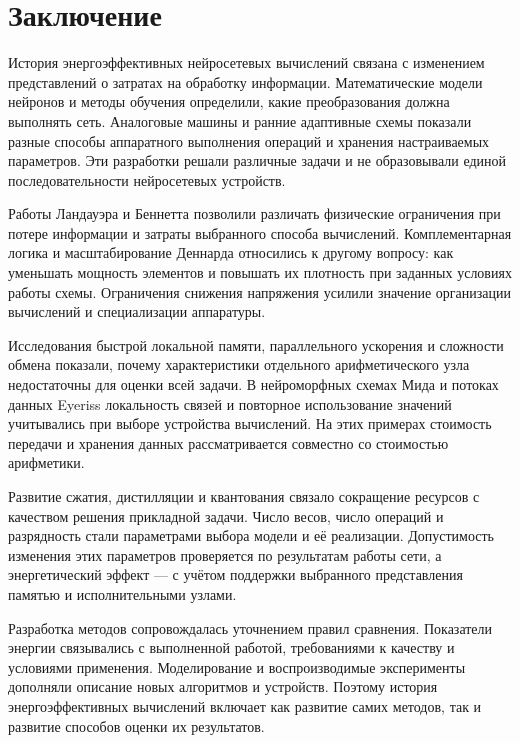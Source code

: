 \section*{Заключение}

История энергоэффективных нейросетевых вычислений связана
с изменением представлений о затратах на обработку информации.
Математические модели нейронов и методы обучения определили,
какие преобразования должна выполнять сеть. Аналоговые машины
и ранние адаптивные схемы показали разные способы аппаратного
выполнения операций и хранения настраиваемых параметров.
Эти разработки решали различные задачи и не образовывали
единой последовательности нейросетевых устройств.

Работы Ландауэра и Беннетта позволили различать физические
ограничения при потере информации и затраты выбранного
способа вычислений. Комплементарная логика и масштабирование
Деннарда относились к другому вопросу: как уменьшать мощность
элементов и повышать их плотность при заданных условиях
работы схемы. Ограничения снижения напряжения усилили
значение организации вычислений и специализации аппаратуры.

Исследования быстрой локальной памяти, параллельного ускорения
и сложности обмена показали, почему характеристики отдельного
арифметического узла недостаточны для оценки всей задачи.
В нейроморфных схемах Мида и потоках данных Eyeriss локальность
связей и повторное использование значений учитывались
при выборе устройства вычислений. На этих примерах стоимость
передачи и хранения данных рассматривается совместно
со стоимостью арифметики.

Развитие сжатия, дистилляции и квантования связало сокращение
ресурсов с качеством решения прикладной задачи. Число весов,
число операций и разрядность стали параметрами выбора модели
и её реализации. Допустимость изменения этих параметров
проверяется по результатам работы сети, а энергетический
эффект — с учётом поддержки выбранного представления
памятью и исполнительными узлами.

Разработка методов сопровождалась уточнением правил
сравнения. Показатели энергии связывались с выполненной
работой, требованиями к качеству и условиями применения.
Моделирование и воспроизводимые эксперименты дополняли
описание новых алгоритмов и устройств. Поэтому история
энергоэффективных вычислений включает как развитие самих
методов, так и развитие способов оценки их результатов.
